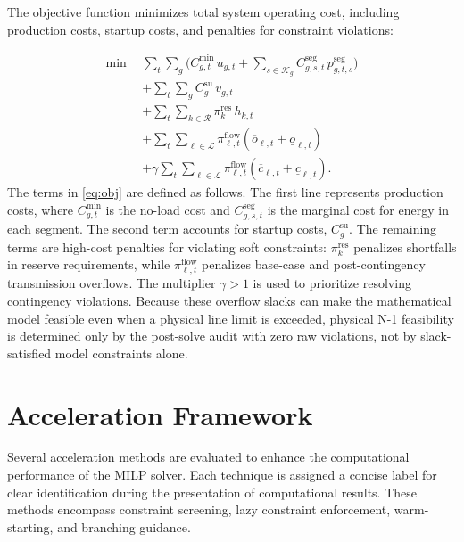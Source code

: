 \documentclass[runningheads]{llncs}
\begin{document}
The objective function minimizes total system operating cost, including production costs, startup costs, and penalties for constraint violations:

\begin{align}
\min \ \ & \sum_{t}\sum_{g}\Big( C^{\min}_{g,t}\,u_{g,t} + \sum_{s\in\mathcal{K}_g} C^{\mathrm{seg}}_{g,s,t}\, p^{\mathrm{seg}}_{g,t,s} \Big) \nonumber\\
& + \sum_{t}\sum_{g} C^{\mathrm{su}}_g\, v_{g,t} \label{eq:obj}\\
& + \sum_{t}\sum_{k\in\mathcal{R}} \pi^{\mathrm{res}}_k\, h_{k,t} \nonumber\\
& + \sum_{t}\sum_{\ell\in\mathcal{L}} \pi^{\mathrm{flow}}_{\ell,t}(\overline{o}_{\ell,t}+\underline{o}_{\ell,t}) \nonumber\\
& + \gamma \sum_{t}\sum_{\ell\in\mathcal{L}} \pi^{\mathrm{flow}}_{\ell,t}(\overline{c}_{\ell,t}+\underline{c}_{\ell,t}). \nonumber
\end{align}
The terms in \eqref{eq:obj} are defined as follows. The first line represents production costs, where $C^{\min}_{g,t}$ is the no-load cost and $C^{\mathrm{seg}}_{g,s,t}$ is the marginal cost for energy in each segment. The second term accounts for startup costs, $C^{\mathrm{su}}_g$. The remaining terms are high-cost penalties for violating soft constraints: $\pi^{\mathrm{res}}_k$ penalizes shortfalls in reserve requirements, while $\pi^{\mathrm{flow}}_{\ell,t}$ penalizes base-case and post-contingency transmission overflows. The multiplier $\gamma>1$ is used to prioritize resolving contingency violations. Because these overflow slacks can make the mathematical model feasible even when a physical line limit is exceeded, physical N-1 feasibility is determined only by the post-solve audit with zero raw violations, not by slack-satisfied model constraints alone.

\section{Acceleration Framework}
Several acceleration methods are evaluated to enhance the computational performance of the MILP solver. Each technique is assigned a concise label for clear identification during the presentation of computational results. These methods encompass constraint screening, lazy constraint enforcement, warm-starting, and branching guidance.
\end{document}
